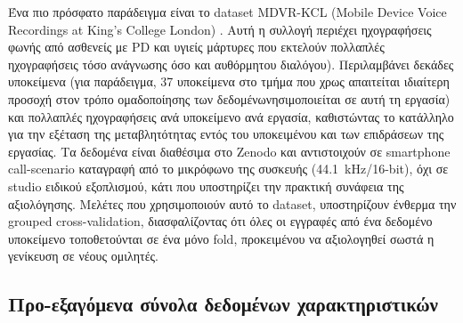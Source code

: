 Ένα πιο πρόσφατο παράδειγμα είναι το dataset MDVR-KCL (Mobile Device Voice Recordings at King's College London) \citep{mdvr_kcl_2019}. Αυτή η συλλογή περιέχει ηχογραφήσεις φωνής από ασθενείς με PD και υγιείς μάρτυρες που εκτελούν πολλαπλές ηχογραφήσεις τόσο ανάγνωσης όσο και αυθόρμητου διαλόγου). 
Περιλαμβάνει δεκάδες υποκείμενα (για παράδειγμα, 37 υποκείμενα στο τμήμα που χρως απαιτείται ιδιαίτερη προσοχή στον τρόπο ομαδοποίησης των δεδομένωνησιμοποιείται σε αυτή τη εργασία) και πολλαπλές ηχογραφήσεις ανά υποκείμενο ανά εργασία, καθιστώντας το κατάλληλο για την εξέταση της μεταβλητότητας εντός του υποκειμένου και των επιδράσεων της εργασίας. 
Τα δεδομένα είναι διαθέσιμα στο Zenodo και αντιστοιχούν σε smartphone call-scenario καταγραφή από το μικρόφωνο της συσκευής (44.1~kHz/16-bit), όχι σε studio ειδικού εξοπλισμού, κάτι που υποστηρίζει την πρακτική συνάφεια της αξιολόγησης. 
Μελέτες που χρησιμοποιούν αυτό το dataset, υποστηρίζουν ένθερμα την grouped cross-validation, διασφαλίζοντας ότι όλες οι εγγραφές από ένα δεδομένο υποκείμενο τοποθετούνται σε ένα μόνο fold, προκειμένου να αξιολογηθεί σωστά η γενίκευση σε νέους ομιλητές.

\subsection{Προ-εξαγόμενα σύνολα δεδομένων χαρακτηριστικών}

